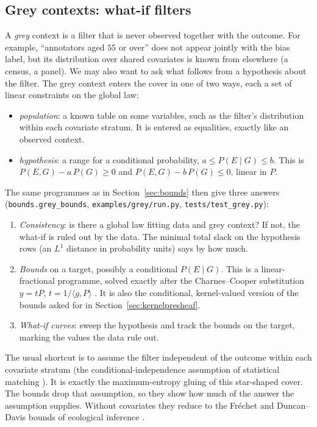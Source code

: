\documentclass[11pt]{article}
\theoremstyle{definition}
\theoremstyle{remark}
\begin{document}
\subsection{Grey contexts: what-if filters}\label{sec:grey}
A \emph{grey} context is a filter that is never observed together with the outcome. For example, ``annotators aged $55$ or over'' does not appear jointly with the bias label, but its distribution over shared covariates is known from elsewhere (a census, a panel). We may also want to ask what follows from a hypothesis about the filter. The grey context enters the cover in one of two ways, each a set of linear constraints on the global law:
\begin{itemize}
  \item \emph{population}: a known table on some variables, such as the filter's distribution within each covariate stratum. It is entered as equalities, exactly like an observed context.
  \item \emph{hypothesis}: a range for a conditional probability, $a\le P(E\mid G)\le b$. This is $P(E,G)-a\,P(G)\ge0$ and $P(E,G)-b\,P(G)\le0$, linear in $P$.
\end{itemize}
The same programmes as in Section~\ref{sec:bounds} then give three answers (\texttt{bounds.grey\_bounds}, \texttt{examples/grey/run.py}, \texttt{tests/test\_grey.py}):
\begin{enumerate}
  \item \emph{Consistency}: is there a global law fitting data and grey context? If not, the what-if is ruled out by the data. The minimal total slack on the hypothesis rows (an $L^1$ distance in probability units) says by how much.
  \item \emph{Bounds} on a target, possibly a conditional $P(E\mid G)$. This is a linear-fractional programme, solved exactly after the Charnes--Cooper substitution $y=tP$, $t=1/\langle g,P\rangle$ \cite{charnescooper}. It is also the conditional, kernel-valued version of the bounds asked for in Section~\ref{sec:kernelpresheaf}.
  \item \emph{What-if curves}: sweep the hypothesis and track the bounds on the target, marking the values the data rule out.
\end{enumerate}
The usual shortcut is to assume the filter independent of the outcome within each covariate stratum (the conditional-independence assumption of statistical matching \cite{dorazio06}). It is exactly the maximum-entropy gluing of this star-shaped cover. The bounds drop that assumption, so they show how much of the answer the assumption supplies. Without covariates they reduce to the Fr\'echet and Duncan--Davis bounds of ecological inference \cite{frechet51,duncandavis53}.
\end{document}
